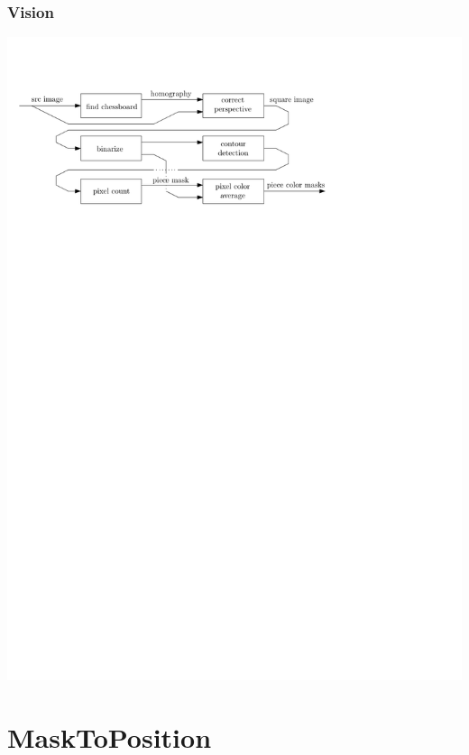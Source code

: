 \documentclass[t]{beamer}
\begin{document}
\begin{frame}[fragile]
\frametitle{Vision}

\vfill

\includegraphics[scale=0.8]{figures/diagram}

\vfill

\end{frame}


\section{MaskToPosition}



\end{document}
